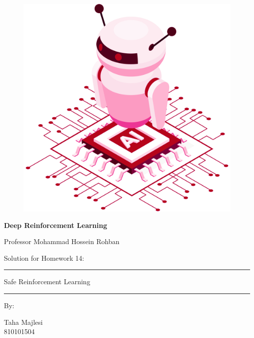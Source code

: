 \documentclass[12pt]{article}
\begin{document}
\thispagestyle{plain}

\begin{center}

\vspace*{-1.5cm}
\begin{figure}[!h]
    \centering
    \includegraphics[width=0.7\linewidth]{figs/cover-std.png}
\end{figure}

{

{\color{DarkBlue} {\fontsize{30}{50} \textbf{
Deep Reinforcement Learning
}}}

{\color{DarkBlue} {\Large
Professor Mohammad Hossein Rohban
}}
}


\vspace{20pt}

{


{\color{RedOrange}
{\Large
Solution for Homework 14:
}\\
}
{\color{BrickRed}
\rule{12cm}{0.5pt}

{\Huge
Safe Reinforcement Learning
}
\rule{12cm}{0.5pt}
}

\vspace{10pt}

{\color{RoyalPurple} { \small By:} } \\
\vspace{10pt}

{\color{Blue} { \LARGE Taha Majlesi } } \\
\vspace{5pt}
{\color{RoyalBlue} { \Large 810101504 } }


}
\end{center}
\end{document}
